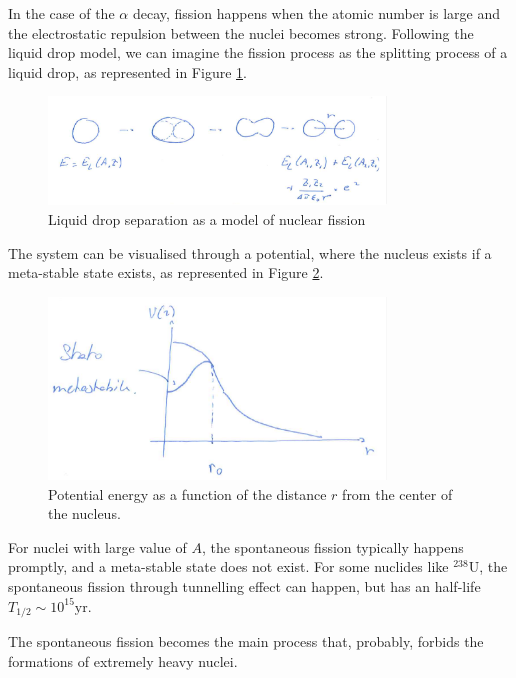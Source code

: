 In the case of the $\alpha$ decay, fission happens when the atomic number is large and the electrostatic repulsion between the nuclei becomes strong. Following the liquid drop model, we can imagine the fission process as the splitting process of a liquid drop, as represented in Figure \ref{fig:nuclear-physics3-fig1}.
\begin{figure}
    \centering
    \includegraphics[width=0.8\textwidth]{Figures/nuclear-physics3-fig1}
    \caption{Liquid drop separation as a model of nuclear fission}
    \label{fig:nuclear-physics3-fig1}
\end{figure}

The system can be visualised through a potential, where the nucleus exists if a meta-stable state exists, as represented in Figure \ref{fig:nuclear-physics3-fig2}.
\begin{figure}
    \centering
    \includegraphics[width=0.8\textwidth]{Figures/nuclear-physics3-fig2}
    \caption{Potential energy as a function of the distance \(r\) from the center of the nucleus.}
    \label{fig:nuclear-physics3-fig2}
\end{figure}
For nuclei with large value of \(A\), the spontaneous fission typically happens promptly, and a meta-stable state does not exist. For some nuclides like $^{238}\mbox{U}$, the spontaneous fission through tunnelling effect can happen, but has an half-life $T_{1/2} \sim 10^{15} \mbox{yr}$.

The spontaneous fission becomes the main process that, probably, forbids the formations of extremely heavy nuclei. 

